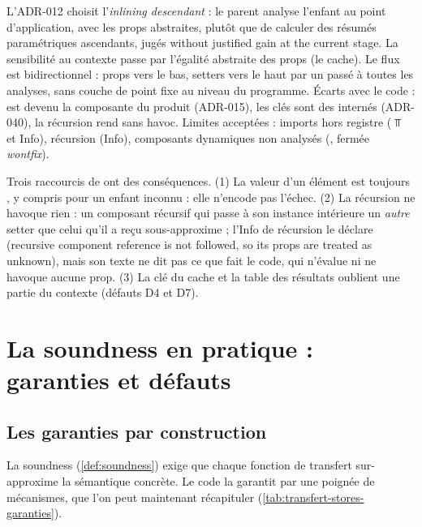 \begin{decision}
  L'ADR-012 choisit l'\emph{inlining descendant} : le parent analyse l'enfant
  au point d'application, avec les props abstraites, plutôt que de calculer
  des résumés paramétriques ascendants, jugés \og without justified gain at
  the current stage\fg{}. La sensibilité au contexte passe par l'égalité
  abstraite des props (le cache). Le flux est bidirectionnel : props vers le
  bas, setters vers le haut par un  passé à toutes les
  analyses, sans couche de point fixe au niveau du programme. Écarts avec le
  code :  est devenu la composante  du
  produit (ADR-015), les clés sont des  internés
  (ADR-040), la récursion rend  sans havoc. Limites
  acceptées : imports hors registre ($\Top$ et Info), récursion (Info),
  composants dynamiques  non analysés
  (, fermée \emph{wontfix}).
\end{decision}

\begin{piege}
  Trois raccourcis de  ont des conséquences.
  (1) La valeur d'un élément est toujours , y compris pour
  un enfant inconnu : elle n'encode pas l'échec. (2) La récursion ne
  havoque rien : un composant récursif qui passe à son instance intérieure
  un \emph{autre} setter que celui qu'il a reçu sous-approxime ; l'Info de
  récursion le déclare (\og recursive component reference  is not
  followed, so its props are treated as unknown\fg{}), mais son texte ne dit
  pas ce que fait le code, qui n'évalue ni ne havoque aucune prop.
  (3) La clé du cache et la table des résultats oublient une partie du
  contexte (défauts D4 et D7).
\end{piege}

\section{La soundness en pratique : garanties et défauts}
\label{sec:transfert-stores-soundness}

\subsection{Les garanties par construction}

La soundness (\cref{def:soundness}) exige que chaque fonction de transfert
sur-approxime la sémantique concrète. Le code la garantit par une poignée de
mécanismes, que l'on peut maintenant récapituler
(\cref{tab:transfert-stores-garanties}).

